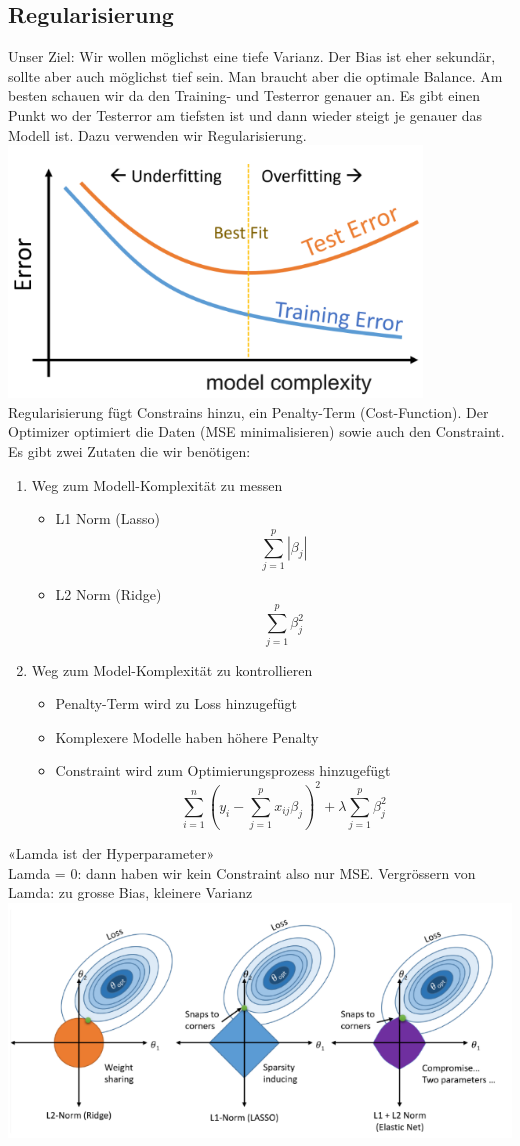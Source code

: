 \subsection{Regularisierung}
Unser Ziel: Wir wollen möglichst eine tiefe Varianz. Der Bias ist eher sekundär, sollte aber auch möglichst tief sein. Man braucht aber die optimale Balance. Am besten schauen wir da den Training- und Testerror genauer an. Es gibt einen Punkt wo der Testerror am tiefsten ist und dann wieder steigt je genauer das Modell ist. Dazu verwenden wir Regularisierung.
\includegraphics[width=\linewidth]{img/regularization.png}
Regularisierung fügt Constrains hinzu, ein Penalty-Term (Cost-Function). Der Optimizer optimiert die Daten (MSE minimalisieren) sowie auch den Constraint.
Es gibt zwei Zutaten die wir benötigen:
\begin{enumerate}
\item Weg zum Modell-Komplexität zu messen
\begin{itemize}
\item L1 Norm (Lasso) 
$$\sum_{j=1}^p | \beta_j|$$
\item L2 Norm (Ridge)
$$\sum_{j=1}^p \beta^2_j$$
\end{itemize}
\item Weg zum Model-Komplexität zu kontrollieren
\begin{itemize}
\item Penalty-Term wird zu Loss hinzugefügt
\item Komplexere Modelle haben höhere Penalty
\item Constraint wird zum Optimierungsprozess hinzugefügt
$$\sum_{i=1}^n(y_i-\sum_{j=1}^p x_{ij} \beta_j)^2+ \lambda \sum_{j=1}^p \beta^2_j$$
\end{itemize}
\end{enumerate}

«Lamda ist der Hyperparameter»\\
Lamda = 0: dann haben wir kein Constraint also nur MSE. Vergrössern von Lamda: zu grosse Bias, kleinere Varianz
\includegraphics[width=\linewidth]{img/l-norm.png}